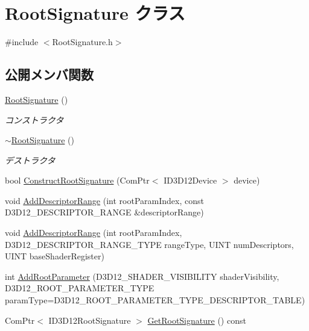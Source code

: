 \hypertarget{class_root_signature}{}\section{Root\+Signature クラス}
\label{class_root_signature}


{\ttfamily \#include $<$Root\+Signature.\+h$>$}

\subsection*{公開メンバ関数}
\begin{DoxyCompactItemize}
\item 
\mbox{\hyperlink{class_root_signature_ac7e523f868fcaa15b6ef1d2d832396a4}{Root\+Signature}} ()
\begin{DoxyCompactList}\small\item\em コンストラクタ \end{DoxyCompactList}\item 
\mbox{\hyperlink{class_root_signature_a8007fe3581f6e8dfb5e8d8fc57263000}{$\sim$\+Root\+Signature}} ()
\begin{DoxyCompactList}\small\item\em デストラクタ \end{DoxyCompactList}\item 
bool \mbox{\hyperlink{class_root_signature_a5328c87baea63d762fc0607fb7d44cd4}{Construct\+Root\+Signature}} (Com\+Ptr$<$ I\+D3\+D12\+Device $>$ device)
\item 
void \mbox{\hyperlink{class_root_signature_ac02128012fae2aaeebc22d37f900bde9}{Add\+Descriptor\+Range}} (int root\+Param\+Index, const D3\+D12\+\_\+\+D\+E\+S\+C\+R\+I\+P\+T\+O\+R\+\_\+\+R\+A\+N\+GE \&descriptor\+Range)
\item 
void \mbox{\hyperlink{class_root_signature_a3faa5b981dae80b1a248ef1acbe50368}{Add\+Descriptor\+Range}} (int root\+Param\+Index, D3\+D12\+\_\+\+D\+E\+S\+C\+R\+I\+P\+T\+O\+R\+\_\+\+R\+A\+N\+G\+E\+\_\+\+T\+Y\+PE range\+Type, U\+I\+NT num\+Descriptors, U\+I\+NT base\+Shader\+Register)
\item 
int \mbox{\hyperlink{class_root_signature_af8af1b06602b6f098515de5504817a6c}{Add\+Root\+Parameter}} (D3\+D12\+\_\+\+S\+H\+A\+D\+E\+R\+\_\+\+V\+I\+S\+I\+B\+I\+L\+I\+TY shader\+Visibility, D3\+D12\+\_\+\+R\+O\+O\+T\+\_\+\+P\+A\+R\+A\+M\+E\+T\+E\+R\+\_\+\+T\+Y\+PE param\+Type=D3\+D12\+\_\+\+R\+O\+O\+T\+\_\+\+P\+A\+R\+A\+M\+E\+T\+E\+R\+\_\+\+T\+Y\+P\+E\+\_\+\+D\+E\+S\+C\+R\+I\+P\+T\+O\+R\+\_\+\+T\+A\+B\+LE)
\item 
Com\+Ptr$<$ I\+D3\+D12\+Root\+Signature $>$ \mbox{\hyperlink{class_root_signature_a47dfa1b251b3fe9a5e7d8823bf87a187}{Get\+Root\+Signature}} () const
\end{DoxyCompactItemize}
